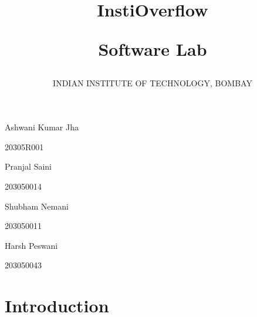 \documentclass[12pt]{article}
\title{\vspace{4cm}\begin{Huge}
InstiOverflow\\[0.2cm]
\end{Huge}
\begin{LARGE}
Software Lab
\end{LARGE}
}
\author{\begin{Large}
 INDIAN INSTITUTE OF TECHNOLOGY, BOMBAY
 \end{Large}}
\date{
\begin{Large}
				\textit{$
				27^{th} November,2020$}
			\end{Large}}
\begin{document}
	
 	\begin{titlepage}
 		
 		\maketitle
 		\begin{center}
 		\begin{Large}
				Ashwani Kumar Jha\\[0.2cm]
		\end{Large}
		\begin{large}
		20305R001
		\end{large}
		\end{center}
		
		\begin{center}
 		\begin{Large}
				Pranjal Saini\\[0.2cm]
		\end{Large}
		\begin{large}
		203050014
		\end{large}
		\end{center}
		
		\begin{center}
 		\begin{Large}
				Shubham Nemani\\[0.2cm]
		\end{Large}
		\begin{large}
		203050011
		\end{large}
		\end{center}
		
		\begin{center}
 		\begin{Large}
				Harsh Peswani\\[0.2cm]
		\end{Large}
		\begin{large}
			203050043
		\end{large}
		\end{center}
		
	
				
 		\thispagestyle{empty}
	\end{titlepage}
	

\tableofcontents
\pagebreak
\section{Introduction}
\end{document}
